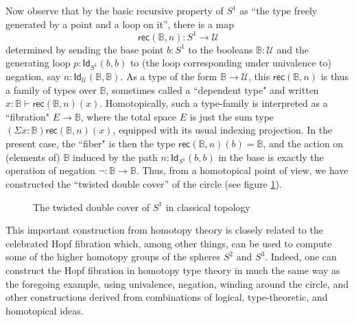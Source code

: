 \documentclass[11pt]{article}
\newcommand{\B}{\ensuremath{\mathbb{B}}}
\newcommand{\Id}{\mathsf{Id}}
\newcommand{\id}[1]{\Id_{#1}}
\newcommand{\rec}{\mathsf{rec}}
\newcommand{\U}{\ensuremath{\mathcal{U}}}
\theoremstyle{remark}
\theoremstyle{definition}
\begin{document}
Now observe that by the basic recursive property of $S^1$ as ``the type freely generated by a point and a loop on it'', there is a map $$\rec(\B,n): S^1 \to \U$$ determined by sending the base point $b:S^1$ to the booleans $\B:\U$ and the generating loop $p : \id{S^1}(b,b)$ to (the loop corresponding under univalence to) negation, say $n : \id{\U}(\B,\B)$.  As a type of the form $\B\to\U$, this $\rec(\B,n)$ is thus a family of types over $\B$, sometimes called a ``dependent type" and written $x:\B \vdash \rec(\B,n)(x)$.  Homotopically, such a type-family is interpreted as a ``fibration" $E\to\B$, where the total space $E$ is just the sum type $(\Sigma{x:\B})\rec(\B,n)(x)$, equipped with its usual indexing projection.  In the present case, the ``fiber" is then the type $\rec(\B,n)(b) = \B$, and the action on (elements of) $\B$ induced by the path $n: \id{S^1}(b,b)$ in the base is exactly the operation of negation $\neg : \B\to \B$.  Thus, from a homotopical point of view, we have constructed the ``twisted double cover'' of the circle (see figure \ref{fig:winding}).
\begin{figure}\centering
  \caption{The twisted double cover of $S^1$ in classical topology}\label{fig:winding}
\end{figure}
%
This important construction from homotopy theory is closely related to the celebrated Hopf fibration which, among other things, can be used to compute some of the higher homotopy groups of the spheres $S^2$ and $S^3$.  Indeed, one can construct the Hopf fibration in homotopy type theory in much the same way as the foregoing example, using univalence, negation, winding around the circle, and other constructions derived from combinations of logical, type-theoretic, and homotopical ideas.  
\end{document}
